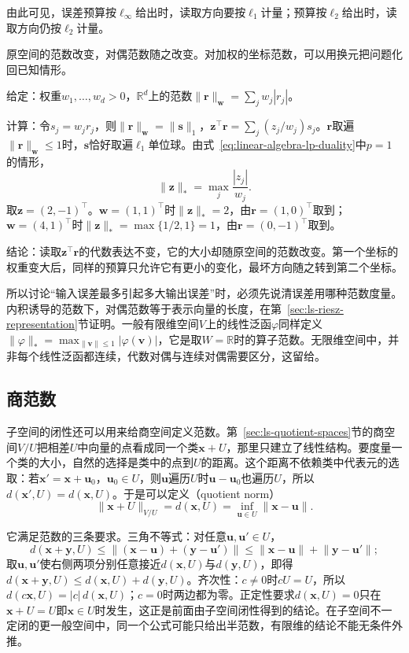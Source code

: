 由此可见，误差预算按$\ell_\infty$给出时，读取方向要按$\ell_1$计量；预算按$\ell_2$给出时，读取方向仍按$\ell_2$计量。

原空间的范数改变，对偶范数随之改变。对加权的坐标范数，可以用换元把问题化回已知情形。
\begin{example}
\label{ex:ls-weighted-dual-norm}
给定：权重$w_1,\ldots,w_d>0$，$\mathbb R^d$上的范数$\lVert\bm r\rVert_{\bm w}=\sum_jw_j|r_j|$。

计算：令$s_j=w_jr_j$，则$\lVert\bm r\rVert_{\bm w}=\lVert\bm s\rVert_1$，$\bm z^\top\bm r=\sum_j(z_j/w_j)s_j$。$\bm r$取遍$\lVert\bm r\rVert_{\bm w}\leq1$时，$\bm s$恰好取遍$\ell_1$单位球。由式~\eqref{eq:linear-algebra-lp-duality}中$p=1$的情形，
\[
 \lVert\bm z\rVert_*=\max_j\frac{|z_j|}{w_j}.
\]
取$\bm z=(2,-1)^\top$。$\bm w=(1,1)^\top$时$\lVert\bm z\rVert_*=2$，由$\bm r=(1,0)^\top$取到；$\bm w=(4,1)^\top$时$\lVert\bm z\rVert_*=\max\{1/2,1\}=1$，由$\bm r=(0,-1)^\top$取到。

结论：读取$\bm z^\top\bm r$的代数表达不变，它的大小却随原空间的范数改变。第一个坐标的权重变大后，同样的预算只允许它有更小的变化，最坏方向随之转到第二个坐标。
\end{example}
所以讨论“输入误差最多引起多大输出误差”时，必须先说清误差用哪种范数度量。内积诱导的范数下，对偶范数等于表示向量的长度，在第~\ref{sec:ls-riesz-representation}节证明。一般有限维空间$V$上的线性泛函$\varphi$同样定义$\lVert\varphi\rVert_*=\max_{\lVert\bm v\rVert\leq1}|\varphi(\bm v)|$，它是取$W=\mathbb R$时的算子范数。无限维空间中，并非每个线性泛函都连续，代数对偶与连续对偶需要区分，这留给。

\subsection{商范数}
\label{sec:ls-quotient-norms}

子空间的闭性还可以用来给商空间定义范数。第~\ref{sec:ls-quotient-spaces}节的商空间$V/U$把相差$U$中向量的点看成同一个类$\bm x+U$，那里只建立了线性结构。要度量一个类的大小，自然的选择是类中的点到$U$的距离。这个距离不依赖类中代表元的选取：若$\bm x'=\bm x+\bm u_0$，$\bm u_0\in U$，则$\bm u$遍历$U$时$\bm u-\bm u_0$也遍历$U$，所以$d(\bm x',U)=d(\bm x,U)$。于是可以定义（quotient norm）
\[
 \lVert\bm x+U\rVert_{V/U}=d(\bm x,U)=\inf_{\bm u\in U}\lVert\bm x-\bm u\rVert .
\]

它满足范数的三条要求。三角不等式：对任意$\bm u,\bm u'\in U$，
\[
 d(\bm x+\bm y,U)\leq\lVert(\bm x-\bm u)+(\bm y-\bm u')\rVert\leq\lVert\bm x-\bm u\rVert+\lVert\bm y-\bm u'\rVert;
\]
取$\bm u,\bm u'$使右侧两项分别任意接近$d(\bm x,U)$与$d(\bm y,U)$，即得$d(\bm x+\bm y,U)\leq d(\bm x,U)+d(\bm y,U)$。齐次性：$c\neq0$时$cU=U$，所以$d(c\bm x,U)=|c|\,d(\bm x,U)$；$c=0$时两边都为零。正定性要求$d(\bm x,U)=0$只在$\bm x+U=U$即$\bm x\in U$时发生，这正是前面由子空间闭性得到的结论。在子空间不一定闭的更一般空间中，同一个公式可能只给出半范数，有限维的结论不能无条件外推。

